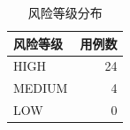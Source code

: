 \begin{table}[H]
\centering
\caption{风险等级分布}
\label{tab:risk_dist}
\small
\begin{tabular}{lr}
\toprule
\textbf{风险等级} & \textbf{用例数} \\
\midrule
    HIGH & 24 \\
    MEDIUM & 4 \\
    LOW & 0 \\
\bottomrule
\end{tabular}
\end{table}
